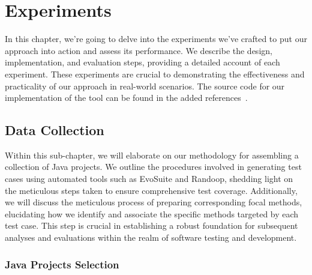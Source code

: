 \chapter{Experiments}
\label{cha:experiments}
\vspace{0.4 cm}

In this chapter, we're going to delve into the experiments we've crafted to put our approach into action and assess its performance. We describe the design, implementation, and evaluation steps, providing a detailed account of each experiment. These experiments are crucial to demonstrating the effectiveness and practicality of our approach in real-world scenarios. The source code for our implementation of the tool can be found in the added references~\cite{evooracle_github}.

\section{Data Collection}
\label{sec:data_collection}
\vspace{0.2 cm}
Within this sub-chapter, we will elaborate on our methodology for assembling a collection of Java projects. We outline the procedures involved in generating test cases using automated tools such as EvoSuite and Randoop\cite{noauthor_randoop_nodate}, shedding light on the meticulous steps taken to ensure comprehensive test coverage. Additionally, we will discuss the meticulous process of preparing corresponding focal methods, elucidating how we identify and associate the specific methods targeted by each test case. This step is crucial in establishing a robust foundation for subsequent analyses and evaluations within the realm of software testing and development.

\vspace{0.1 cm}
\subsection{Java Projects Selection}
\label{sec:projects_selection}
\vspace{0.1 cm}


